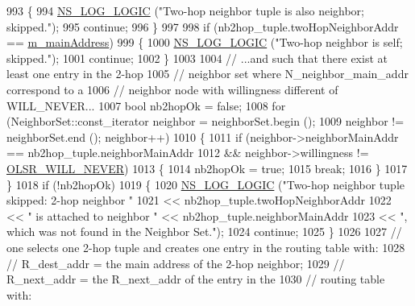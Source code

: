 \begin{DoxyCode}
993         \{
994           \hyperlink{group__logging_ga88acd260151caf2db9c0fc84997f45ce}{NS\_LOG\_LOGIC} (\textcolor{stringliteral}{"Two-hop neighbor tuple is also neighbor; skipped."});
995           \textcolor{keywordflow}{continue};
996         \}
997 
998       \textcolor{keywordflow}{if} (nb2hop\_tuple.twoHopNeighborAddr == \hyperlink{classns3_1_1olsr_1_1RoutingProtocol_a58cc50ed5d1039aab603e90e318aabfb}{m\_mainAddress})
999         \{
1000           \hyperlink{group__logging_ga88acd260151caf2db9c0fc84997f45ce}{NS\_LOG\_LOGIC} (\textcolor{stringliteral}{"Two-hop neighbor is self; skipped."});
1001           \textcolor{keywordflow}{continue};
1002         \}
1003 
1004       \textcolor{comment}{// ...and such that there exist at least one entry in the 2-hop}
1005       \textcolor{comment}{// neighbor set where N\_neighbor\_main\_addr correspond to a}
1006       \textcolor{comment}{// neighbor node with willingness different of WILL\_NEVER...}
1007       \textcolor{keywordtype}{bool} nb2hopOk = \textcolor{keyword}{false};
1008       \textcolor{keywordflow}{for} (NeighborSet::const\_iterator neighbor = neighborSet.begin ();
1009            neighbor != neighborSet.end (); neighbor++)
1010         \{
1011           \textcolor{keywordflow}{if} (neighbor->neighborMainAddr == nb2hop\_tuple.neighborMainAddr
1012               && neighbor->willingness != \hyperlink{olsr-routing-protocol_8cc_a146d2c103abd49bdfad44b4424769696}{OLSR\_WILL\_NEVER})
1013             \{
1014               nb2hopOk = \textcolor{keyword}{true};
1015               \textcolor{keywordflow}{break};
1016             \}
1017         \}
1018       \textcolor{keywordflow}{if} (!nb2hopOk)
1019         \{
1020           \hyperlink{group__logging_ga88acd260151caf2db9c0fc84997f45ce}{NS\_LOG\_LOGIC} (\textcolor{stringliteral}{"Two-hop neighbor tuple skipped: 2-hop neighbor "}
1021                         << nb2hop\_tuple.twoHopNeighborAddr
1022                         << \textcolor{stringliteral}{" is attached to neighbor "} << nb2hop\_tuple.neighborMainAddr
1023                         << \textcolor{stringliteral}{", which was not found in the Neighbor Set."});
1024           \textcolor{keywordflow}{continue};
1025         \}
1026 
1027       \textcolor{comment}{// one selects one 2-hop tuple and creates one entry in the routing table with:}
1028       \textcolor{comment}{//                R\_dest\_addr  =  the main address of the 2-hop neighbor;}
1029       \textcolor{comment}{//                R\_next\_addr  = the R\_next\_addr of the entry in the}
1030       \textcolor{comment}{//                               routing table with:}

\end{DoxyCode}
